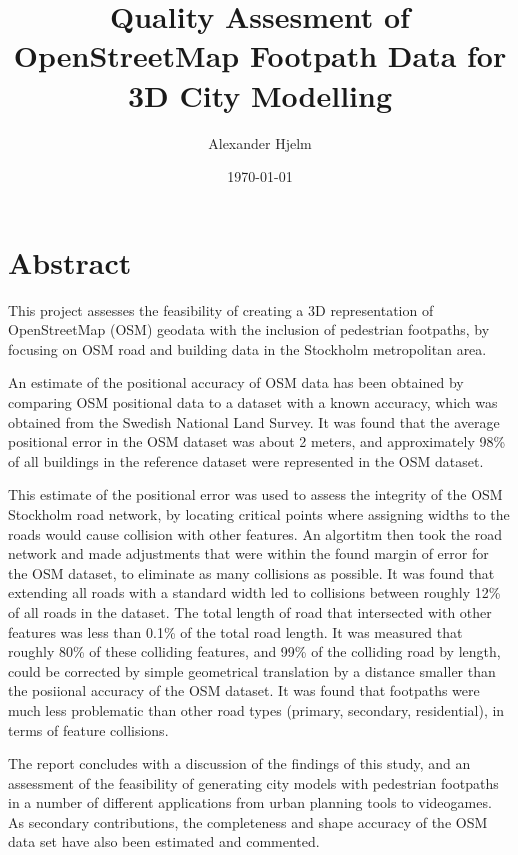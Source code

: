 \documentclass[a4paper]{article}
\title{Quality Assesment of OpenStreetMap Footpath Data for 3D City Modelling}
\author{Alexander Hjelm}
\date{\today}
\begin{document}
\maketitle

\section{Abstract}

This project assesses the feasibility of creating a 3D representation of OpenStreetMap (OSM) geodata with the inclusion of pedestrian footpaths, by focusing on OSM road and building data in the Stockholm metropolitan area.

An estimate of the positional accuracy of OSM data has been obtained by comparing OSM positional data to a dataset with a known accuracy, which was obtained from the Swedish National Land Survey.
It was found that the average positional error in the OSM dataset was about 2 meters, and approximately 98\% of all buildings in the reference dataset were represented in the OSM dataset.

This estimate of the positional error was used to assess the integrity of the OSM Stockholm road network, by locating critical points where assigning widths to the roads would cause collision with other features.
An algortitm then took the road network and made adjustments that were within the found margin of error for the OSM dataset, to eliminate as many collisions as possible.
It was found that extending all roads with a standard width led to collisions between roughly 12\% of all roads in the dataset.
The total length of road that intersected with other features was less than 0.1\% of the total road length.
It was measured that roughly 80\% of these colliding features, and 99\% of the colliding road by length, could be corrected by simple geometrical translation by a distance smaller than the posiional accuracy of the OSM dataset.
It was found that footpaths were much less problematic than other road types (primary, secondary, residential), in terms of feature collisions.

The report concludes with a discussion of the findings of this study, and an assessment of the feasibility of generating city models with pedestrian footpaths in a number of different applications from urban planning tools to videogames.
As secondary contributions, the completeness and shape accuracy of the OSM data set have also been estimated and commented.

\newpage
\setlength{\parskip}{0em}
\tableofcontents
\setlength{\parskip}{1em}
\newpage
\end{document}
